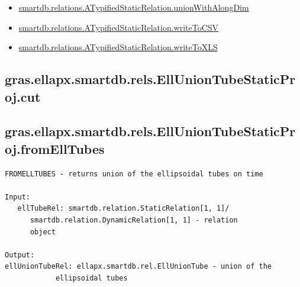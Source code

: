 \documentclass[letterpaper,10pt,english]{sphinxmanual}
\begin{document}
\begin{itemize}
\item {} 
{\hyperref[chap_functions:smartdb-relations-atypifiedstaticrelation-unionwithalongdim]{smartdb.relations.ATypifiedStaticRelation.unionWithAlongDim}}

\item {} 
{\hyperref[chap_functions:smartdb-relations-atypifiedstaticrelation-writetocsv]{smartdb.relations.ATypifiedStaticRelation.writeToCSV}}

\item {} 
{\hyperref[chap_functions:smartdb-relations-atypifiedstaticrelation-writetoxls]{smartdb.relations.ATypifiedStaticRelation.writeToXLS}}

\end{itemize}


\subsection{gras.ellapx.smartdb.rels.EllUnionTubeStaticProj.cut}
\label{chap_functions:gras-ellapx-smartdb-rels-elluniontubestaticproj-cut}

\subsection{gras.ellapx.smartdb.rels.EllUnionTubeStaticProj.fromEllTubes}
\label{chap_functions:gras-ellapx-smartdb-rels-elluniontubestaticproj-fromelltubes}
\begin{Verbatim}[commandchars=\\\{\}]
FROMELLTUBES - returns union of the ellipsoidal tubes on time

Input:
   ellTubeRel: smartdb.relation.StaticRelation[1, 1]/
      smartdb.relation.DynamicRelation[1, 1] - relation
      object

Output:
ellUnionTubeRel: ellapx.smartdb.rel.EllUnionTube - union of the
            ellipsoidal tubes
\end{Verbatim}
\end{document}
